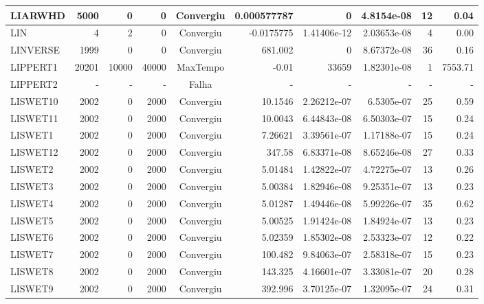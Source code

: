 \begin{center}
\begin{longtable}{|l|r|r|r|c|r|r|r|r|r|}
 LIARWHD &   5000 &      0 &      0 & Convergiu  & 0.000577787 &              0 &  4.8154e-08 &     12 &    0.04 \\ \hline
     LIN &      4 &      2 &      0 & Convergiu  &  -0.0175775 &    1.41406e-12 & 2.03653e-08 &      4 &    0.00 \\ \hline
LINVERSE &   1999 &      0 &      0 & Convergiu  &     681.002 &              0 & 8.67372e-08 &     36 &    0.16 \\ \hline
LIPPERT1 &  20201 &  10000 &  40000 & MaxTempo   &       -0.01 &          33659 & 1.82301e-08 &      1 & 7553.71 \\ \hline
LIPPERT2 & - & - & - & Falha & - & - & - & - & - \\ \hline
LISWET10 &   2002 &      0 &   2000 & Convergiu  &     10.1546 &    2.26212e-07 &  6.5305e-07 &     25 &    0.59 \\ \hline
LISWET11 &   2002 &      0 &   2000 & Convergiu  &     10.0043 &    6.44843e-08 & 6.50303e-07 &     15 &    0.24 \\ \hline
 LISWET1 &   2002 &      0 &   2000 & Convergiu  &     7.26621 &    3.39561e-07 & 1.17188e-07 &     15 &    0.24 \\ \hline
LISWET12 &   2002 &      0 &   2000 & Convergiu  &      347.58 &    6.83371e-08 & 8.65246e-08 &     27 &    0.33 \\ \hline
 LISWET2 &   2002 &      0 &   2000 & Convergiu  &     5.01484 &    1.42822e-07 & 4.72275e-07 &     13 &    0.26 \\ \hline
 LISWET3 &   2002 &      0 &   2000 & Convergiu  &     5.00384 &    1.82946e-08 & 9.25351e-07 &     13 &    0.23 \\ \hline
 LISWET4 &   2002 &      0 &   2000 & Convergiu  &     5.01287 &    1.49446e-08 & 5.99226e-07 &     35 &    0.62 \\ \hline
 LISWET5 &   2002 &      0 &   2000 & Convergiu  &     5.00525 &    1.91424e-08 & 1.84924e-07 &     13 &    0.23 \\ \hline
 LISWET6 &   2002 &      0 &   2000 & Convergiu  &     5.02359 &    1.85302e-08 & 2.53323e-07 &     12 &    0.22 \\ \hline
 LISWET7 &   2002 &      0 &   2000 & Convergiu  &     100.482 &    9.84063e-07 & 2.58318e-07 &     15 &    0.23 \\ \hline
 LISWET8 &   2002 &      0 &   2000 & Convergiu  &     143.325 &    4.16601e-07 & 3.33081e-07 &     20 &    0.28 \\ \hline
 LISWET9 &   2002 &      0 &   2000 & Convergiu  &     392.996 &    3.70125e-07 & 1.32095e-07 &     24 &    0.31 \\ \hline

\end{longtable}
\end{center}
